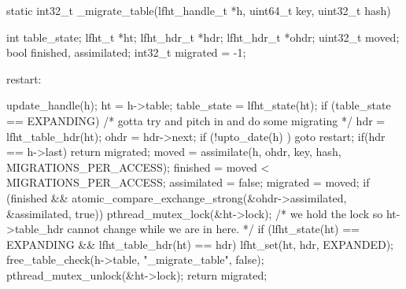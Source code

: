 \begin{center}
\begin{clisting}
static int32_t _migrate_table(lfht_handle_t *h, uint64_t key, uint32_t hash){
  int table_state;
  lfht_t *ht;
  lfht_hdr_t *hdr;
  lfht_hdr_t *ohdr;
  uint32_t moved;
  bool finished, assimilated;
  int32_t migrated = -1;
  
 restart:

  update_handle(h);
  ht = h->table;
  table_state = lfht_state(ht);
  if (table_state == EXPANDING){
    /* gotta try and pitch in and do some migrating */
    hdr = lfht_table_hdr(ht);
    ohdr = hdr->next;
    if (!upto_date(h) ){ goto restart; }
    if(hdr == h->last){ return migrated; }
    moved = assimilate(h, ohdr, key, hash,  MIGRATIONS_PER_ACCESS);
    finished = moved < MIGRATIONS_PER_ACCESS;
    assimilated = false;
    migrated = moved;
    if (finished  &&  atomic_compare_exchange_strong(&ohdr->assimilated, &assimilated, true)){
      pthread_mutex_lock(&ht->lock);
      /* we hold the lock so ht->table_hdr cannot change while we are in here. */
      if (lfht_state(ht) == EXPANDING  && lfht_table_hdr(ht) == hdr){
	lfht_set(ht, hdr, EXPANDED);
        free_table_check(h->table, "_migrate_table", false);
      }
      pthread_mutex_unlock(&ht->lock);
    }
  }
  return migrated;
}
\end{clisting}
\end{center}

